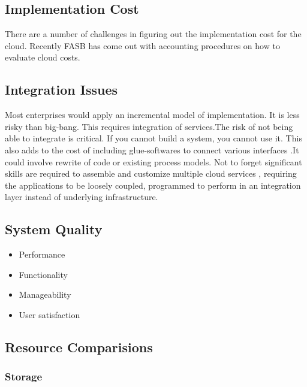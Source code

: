 \subsection{Implementation Cost}  
There are a number of challenges in figuring out the implementation cost for the cloud. Recently FASB has come out with accounting procedures on how to evaluate cloud costs.

\subsection{Integration Issues} 
Most enterprises would apply an incremental model of implementation. It is less risky than big-bang. This requires integration of services.The risk of not being able to integrate is critical. If you cannot build a system, you cannot use it. This also adds to the cost of including glue-softwares to connect various interfaces .It could involve rewrite of code or existing process models. Not to forget significant skills are required to assemble and customize multiple cloud services , requiring the applications to be loosely coupled, programmed to perform in an integration layer instead of underlying infrastructure.  

\subsection{System Quality}  
\begin{itemize}
	\item Performance 
	\item Functionality 
	\item Manageability 
	\item User satisfaction 
\end{itemize}

\subsection{Resource Comparisions}

\subsubsection{Storage}

